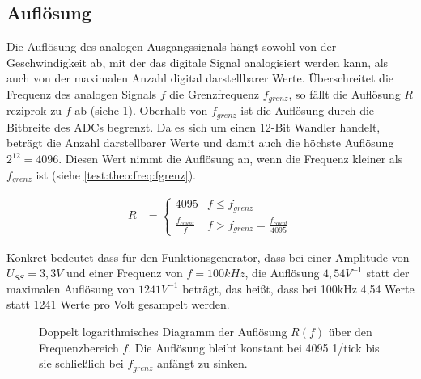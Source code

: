 \subsection{Auflösung}
Die Auflösung des analogen Ausgangssignals hängt sowohl von der Geschwindigkeit ab, mit der das digitale Signal analogisiert werden kann, als auch von der maximalen Anzahl digital darstellbarer Werte.
Überschreitet die Frequenz des analogen Signals $f$ die Grenzfrequenz $f_{grenz}$, so fällt die Auflösung $R$ reziprok zu $f$ ab (siehe \cref{test:theo:res:plot}).
Oberhalb von $f_{grenz}$ ist die Auflösung durch die Bitbreite des ADCs begrenzt.
Da es sich um einen 12-Bit Wandler handelt, beträgt die Anzahl darstellbarer Werte und damit auch die höchste Auflösung $2^{12} = 4096$.
Diesen Wert nimmt die Auflösung an, wenn die Frequenz kleiner als $f_{grenz}$ ist (siehe \cref{test:theo:freq:fgrenz}).

\begin{align}
  R &= \begin{cases}
    4095               & f \leq f_{grenz}                      \\
    \frac{f_{count}}{f} & f > f_{grenz} = \frac{f_{count}}{4095}
        \end{cases} \label{test:theo:freq:fgrenz}
\end{align}

Konkret bedeutet dass für den Funktionsgenerator, dass bei einer Amplitude von $U_{SS}=3,3V$ und einer Frequenz von $f=100kHz$, die Auflösung $4,54V^{-1}$ statt der maximalen Auflösung von $1241V^{-1}$ beträgt, das heißt, dass bei 100kHz 4,54 Werte statt 1241 Werte pro Volt gesampelt werden.

\begin{figure}[h] \centering
 \caption{Doppelt logarithmisches Diagramm der Auflösung $R(f)$ über den Frequenzbereich $f$. Die Auflösung bleibt konstant bei 4095 1/tick bis sie schließlich bei $f_{grenz}$ anfängt zu sinken.} \label{test:theo:res:plot}
\end{figure}

